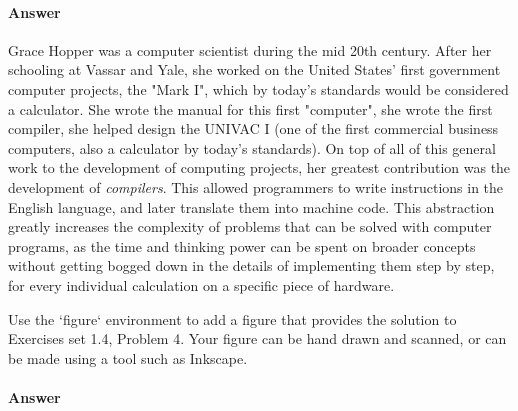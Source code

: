\documentclass{article}
\begin{document}
\paragraph{Answer}

Grace Hopper was a computer scientist during the mid 20th century. After her schooling at Vassar and Yale, she worked on the United States' first government computer projects, the "Mark I", which by today's standards would be considered a calculator. She wrote the manual for this first "computer", she wrote the first compiler, she helped design the UNIVAC I (one of the first commercial business computers, also a calculator by today's standards). On top of all of this general work to the development of computing projects, her greatest contribution was the development of \emph{compilers}. This allowed programmers to write instructions in the English language, and later translate them into machine code. This abstraction greatly increases the complexity of problems that can be solved with computer programs, as the time and thinking power can be spent on broader concepts without getting bogged down in the details of implementing them step by step, for every individual calculation on a specific piece of hardware.

\collab{\todo{}}

Use the `figure` environment to add a figure that provides the solution to
Exercises set 1.4, Problem 4.  Your figure can be hand drawn and scanned, or can
be made using a tool such as Inkscape.

\paragraph{Answer}

\end{document}
